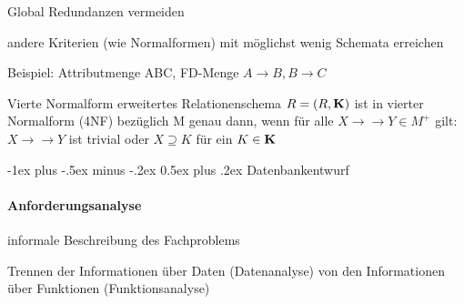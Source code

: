 \documentclass[a4paper]{article}
\makeatletter
\renewcommand{\section}{\@startsection{section}{1}{0mm}%
                                {-1ex plus -.5ex minus -.2ex}%
                                {0.5ex plus .2ex}%
                                {\normalfont\large\bfseries}}
\makeatother
\begin{document}
\begin{multicols}{3}
\begin{description*}
\begin{itemize*}
            \item Global Redundanzen vermeiden
            \item andere Kriterien (wie Normalformen) mit möglichst wenig Schemata erreichen
            \item Beispiel: Attributmenge ABC, FD-Menge ${A \rightarrow B, B \rightarrow C}$
        \end{itemize*}
        \item[Vierte Normalform] erweitertes Relationenschema $R = (R, \bf{K})$ ist in vierter Normalform (4NF) bezüglich M genau dann, wenn für alle $X\rightarrow\rightarrow Y \in M^+$ gilt: $X\rightarrow\rightarrow Y$ ist trivial oder $X\supseteq K$ für ein $K\in\bf{K}$
    \end{description*}

    \section{Datenbankentwurf}
    \paragraph{Anforderungsanalyse}
    \begin{itemize*}
        \item informale Beschreibung des Fachproblems
        \item Trennen der Informationen über Daten (Datenanalyse) von den Informationen über Funktionen (Funktionsanalyse)
    \end{itemize*}


\end{multicols}
\end{document}
